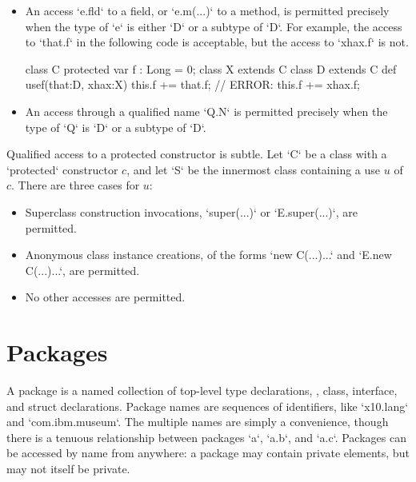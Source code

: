 \begin{itemize}

\item An access \xcd`e.fld` to a field, or \xcd`e.m(...)` to a method, is
      permitted precisely when the type of \xcd`e` is either \xcd`D` or a
      subtype of \xcd`D`.  
For example, the access to \xcd`that.f` in the following code is acceptable, but
the access to \xcd`xhax.f` is not.  
\begin{xten}
class C {
  protected var f : Long = 0;
}
class X extends C {}
class D extends C {
  def usef(that:D, xhax:X) {
     this.f += that.f; 
     // ERROR: this.f += xhax.f;
  }
}
\end{xten}
%


\item An access through a qualified name \xcd`Q.N` is permitted precisely when
      the type of \xcd`Q` is \xcd`D` or a subtype of \xcd`D`. 

\end{itemize}

Qualified access to a protected constructor is subtle.  Let \xcd`C` be a class
with a \xcd`protected` constructor $c$, and let \xcd`S` be the innermost
class containing a use $u$ of $c$.  There are three cases for $u$: 

\begin{itemize}
\item Superclass construction invocations, \xcd`super(...)` or
      \xcd`E.super(...)`, are permitted.
\item Anonymous class instance creations, of the forms  \xcd`new C(...){...}`
      and \xcd`E.new C(...){...}`, are
      permitted.
\item No other accesses are permitted. 
\end{itemize}

\section{Packages}

A package is a named collection of top-level type declarations, \viz, class,
interface, and struct declarations. Package names are sequences of
identifiers, like \xcd`x10.lang` and \xcd`com.ibm.museum`. The multiple names
are simply a convenience, though there is a tenuous relationship between
packages \xcd`a`, \xcd`a.b`, and \xcd`a.c`.   Packages can be accessed by
name from anywhere: a package may contain private elements, but may not itself
be private. 

